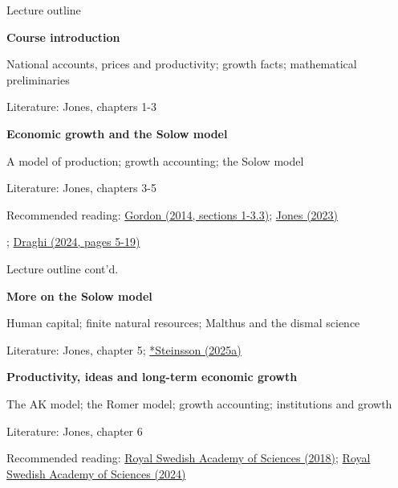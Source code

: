 \documentclass[10pt,handout]{beamer}
\begin{document}
\begin{frame}{Lecture outline}
\begin{itemize}
    \item [L1.] \textbf{Course introduction} 
    \small{
    \item[] National accounts, prices and productivity; growth facts; mathematical preliminaries
    \item[] Literature: Jones, chapters 1-3
    }
\end{itemize}

\bigskip

\begin{itemize}
    \item [L2.] \textbf{Economic growth and the Solow model} 
    \small{
    \item[] A model of production; growth accounting; the Solow model
    \item[] Literature: Jones, chapters 3-5
    \item[] Recommended reading: \href{https://www.nber.org/system/files/working_papers/w19895/w19895.pdf}{Gordon (2014, sections 1-3.3)}; \href{https://www.kansascityfed.org/Jackson\%20Hole/documents/9771/GrowthOutlookPanel.pdf}{Jones (2023)}}; \href{https://commission.europa.eu/document/download/97e481fd-2dc3-412d-be4c-f152a8232961_en?filename=The\%20future\%20of\%20European\%20competitiveness\%20\_\%20A\%20competitiveness\%20strategy\%20for\%20Europe.pdf}{Draghi (2024, pages 5-19)}
\end{itemize}
\end{frame}


\begin{frame}{Lecture outline cont'd.}
\begin{itemize}
    \item [L3.] \textbf{More on the Solow model}
    \small{
    \item[] Human capital; finite natural resources; Malthus and the dismal science
    \item[] Literature: Jones, chapter 5; \href{https://eml.berkeley.edu/~jsteinsson/teaching/malthus.pdf}{*Steinsson (2025a)}
    }
\end{itemize}

\bigskip

\begin{itemize}
    \item [L4.] \textbf{Productivity, ideas and long-term economic growth} 
    \small{
    \item[] The AK model; the Romer model; growth accounting; institutions and growth
    \item[] Literature: Jones, chapter 6 
    \item[] Recommended reading: \href{https://www.nobelprize.org/uploads/2018/10/popular-economicsciencesprize2018.pdf}{Royal Swedish Academy of Sciences (2018)}; \href{https://www.nobelprize.org/uploads/2024/10/popular-economicsciencesprize2024.pdf}{Royal Swedish Academy of Sciences (2024)}
    }
\end{itemize}
\end{frame}
\end{document}
